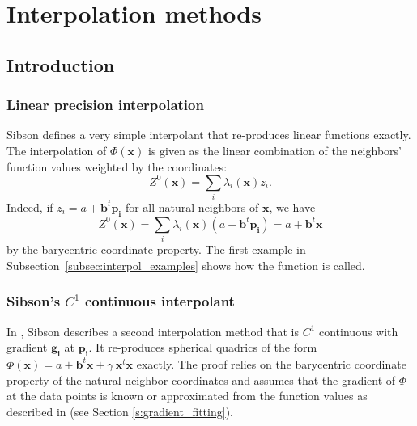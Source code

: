 \section{Interpolation methods}\label{sec:interpolation}
\subsection{Introduction}
\subsubsection{Linear precision interpolation}

Sibson \cite{s-bdnni-81} defines a very simple interpolant that
re-produces linear functions exactly. The interpolation of
$\Phi(\mathbf{x})$ is given as the linear combination of the neighbors' function
values weighted by the coordinates:
\begin{displaymath}
  Z^0(\mathbf{x}) = \sum_i  \lambda_i(\mathbf{x}) z_i.
\end{displaymath}
Indeed, if $z_i=a + \mathbf{b}^t \mathbf{p_i}$ for all natural
neighbors of $\mathbf{x}$, we have
\[  Z^0(\mathbf{x}) = \sum_i  \lambda_i(\mathbf{x}) (a + \mathbf{b}^t\mathbf{p_i}) = a+\mathbf{b}^t \mathbf{x}\]
by the barycentric coordinate property. The first example in
Subsection~\ref{subsec:interpol_examples} shows how the function is
called.

\subsubsection{Sibson's $C^1$ continuous interpolant}
In \cite{s-bdnni-81}, Sibson describes a second interpolation method
that is $C^1$ continuous with gradient $\mathbf{g_i}$ at
$\mathbf{p_i}$. It
re-produces spherical quadrics of the form $\Phi(\mathbf{x}) =a +
\mathbf{b}^t \mathbf{x} +\gamma\ \mathbf{x}^t\mathbf{x}$ exactly. The
proof relies on the barycentric coordinate property of the natural
neighbor coordinates and assumes that the gradient of $\Phi$ at the
data points is known or approximated from the function values as
described in \cite{s-bdnni-81} (see Section \ref{s:gradient_fitting}). 

